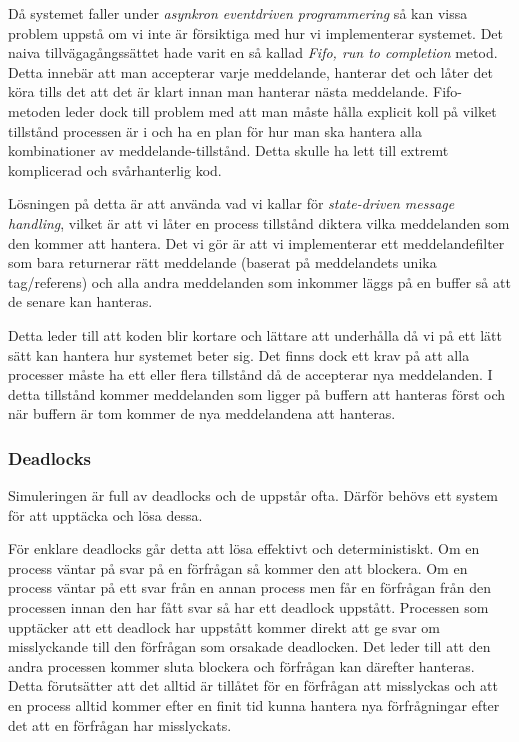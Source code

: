 \documentclass[12pt]{article}
\begin{document}
Då systemet faller under \textit{asynkron eventdriven programmering} så kan vissa problem uppstå om vi inte är försiktiga med hur vi implementerar systemet.
Det naiva tillvägagångssättet hade varit en så kallad \textit{Fifo, run to completion} metod.
Detta innebär att man accepterar varje meddelande, hanterar det och låter det köra tills det att det är klart innan man hanterar nästa meddelande.
Fifo-metoden leder dock till problem med att man måste hålla explicit koll på vilket tillstånd processen är i och ha en plan för hur man ska hantera alla kombinationer av meddelande-tillstånd.
Detta skulle ha lett till extremt komplicerad och svårhanterlig kod.~\cite{wiger-complexity}

Lösningen på detta är att använda vad vi kallar för \textit{state-driven message handling},
vilket är att vi låter en process tillstånd diktera vilka meddelanden som den kommer att hantera.
Det vi gör är att vi implementerar ett meddelandefilter som bara returnerar rätt meddelande (baserat på meddelandets unika tag/referens) och alla andra meddelanden som inkommer läggs på en buffer så att de senare kan hanteras.

Detta leder till att koden blir kortare och lättare att underhålla då vi på ett lätt sätt kan hantera hur systemet beter sig.
Det finns dock ett krav på att alla processer måste ha ett eller flera tillstånd då de accepterar nya meddelanden.
I detta tillstånd kommer meddelanden som ligger på buffern att hanteras först och när buffern är tom kommer de nya meddelandena att hanteras.

\subsubsection{Deadlocks}
Simuleringen är full av deadlocks och de uppstår ofta.
Därför behövs ett system för att upptäcka och lösa dessa.

För enklare deadlocks går detta att lösa effektivt och deterministiskt.
Om en process väntar på svar på en förfrågan så kommer den att blockera.
Om en process väntar på ett svar från en annan process men får en förfrågan från den processen innan den har fått svar så har ett deadlock uppstått.
Processen som upptäcker att ett deadlock har uppstått kommer direkt att ge svar om misslyckande till den förfrågan som orsakade deadlocken.
Det leder till att den andra processen kommer sluta blockera och förfrågan kan därefter hanteras.
Detta förutsätter att det alltid är tillåtet för en förfrågan att misslyckas och att en process alltid kommer efter en finit tid kunna hantera nya förfrågningar efter det att en förfrågan har misslyckats.
\end{document}
